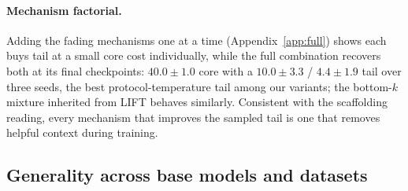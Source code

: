 \documentclass{article} %
\begin{document}
\paragraph{Mechanism factorial.} Adding the fading mechanisms one at a time (Appendix~\ref{app:full}) shows each buys tail at a small core cost individually, while the full combination recovers both at its final checkpoints: $40.0 \pm 1.0$ core with a $10.0 \pm 3.3$ / $4.4 \pm 1.9$ tail over three seeds, the best protocol-temperature tail among our variants; the bottom-$k$ mixture inherited from LIFT behaves similarly. Consistent with the scaffolding reading, every mechanism that improves the sampled tail is one that removes helpful context during training.

\subsection{Generality across base models and datasets}
\label{sec:generality}
\end{document}

